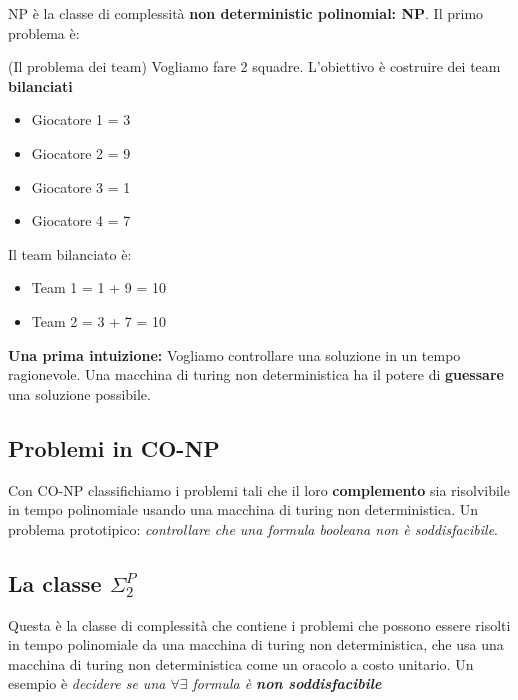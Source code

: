 NP è la classe di complessità \textbf{non deterministic polinomial: NP}. Il
primo problema è:
\begin{definition}(Il problema dei team)
    Vogliamo fare 2 squadre. L'obiettivo è costruire dei team \textbf{bilanciati}
\end{definition}

\begin{esempio}
    \begin{itemize}
        \item Giocatore 1 = 3
        \item Giocatore 2 = 9
        \item Giocatore 3 = 1
        \item Giocatore 4 = 7
    \end{itemize}

    Il team bilanciato è:
    \begin{itemize}
        \item Team 1 = 1 + 9 = 10
        \item Team 2 = 3 + 7 = 10

    \end{itemize}
\end{esempio}

\textbf{Una prima intuizione:} Vogliamo controllare una soluzione in un tempo ragionevole. Una macchina di turing non
deterministica ha il potere di \textbf{guessare} una soluzione possibile.

\subsection{Problemi in CO-NP}

Con CO-NP classifichiamo i problemi tali che il loro \textbf{complemento} sia
risolvibile in tempo polinomiale usando una macchina di turing non
deterministica. Un problema prototipico: \textit{controllare che una formula
    booleana non è soddisfacibile}.

\subsection{La classe $\Sigma_2^P$}
Questa è la classe di complessità che contiene i problemi che possono essere
risolti in tempo polinomiale da una macchina di turing non deterministica, che
usa una macchina di turing non deterministica come un oracolo a costo unitario.
Un esempio è \textit{decidere se una $\forall\exists$ formula è \textbf{non
        soddisfacibile}}

